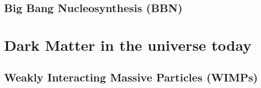 \subsection{Big Bang Nucleosynthesis (BBN)}


\section{Dark Matter in the universe today}


\subsection{Weakly Interacting Massive Particles (WIMPs)}

